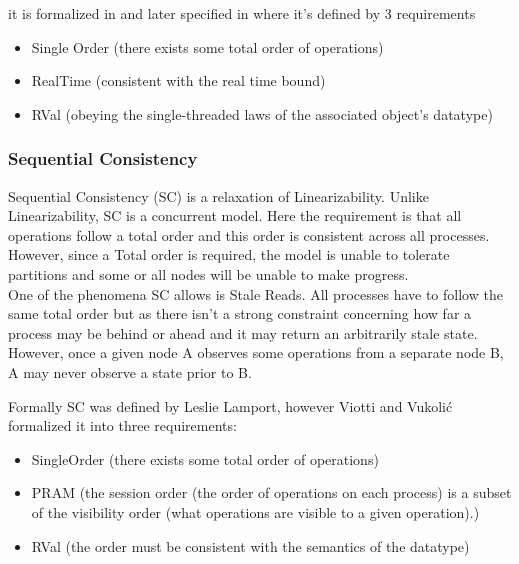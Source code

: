 \documentclass[a4paper,10pt,titlepage]{report}
\begin{document}
it is formalized  in \cite{Linearizability} and later specified  in \cite{ConsistencyinNonTransactionalDistributedStorageSystems} where it's defined by 3 requirements

\begin{itemize}
    \item Single Order (there exists some total order of operations)
    \item RealTime (consistent with the real time bound)
    \item RVal (obeying the single-threaded laws of the associated object's datatype)
\end{itemize}

\subsubsection{Sequential Consistency}
Sequential Consistency (SC) is a relaxation of Linearizability. Unlike Linearizability, SC is a concurrent model. Here the requirement is that all operations follow a total order and this order is consistent across all processes. However, since a Total order is required, the model is unable to tolerate partitions and some or all nodes will be unable to make progress. 
\\ \vspace{5mm}
One of the phenomena SC allows is Stale Reads. All processes have to follow the same total order but as there isn't a strong constraint concerning how far a process may be behind or ahead and it may return an arbitrarily stale state. However, once a given node A observes some operations from a separate node B, A may never observe a state prior to B.

Formally SC was defined by Leslie Lamport\cite{Lamport1979how}, however Viotti and Vukolić\cite{ConsistencyinNonTransactionalDistributedStorageSystems} formalized it into three requirements:
\begin{itemize}
    \item SingleOrder (there exists some total order of operations)
    \item PRAM (the session order (the order of operations on each process) is a subset of the visibility order (what operations are visible to a given operation).)
    \item RVal (the order must be consistent with the semantics of the datatype)
\end{itemize}

\end{document}
